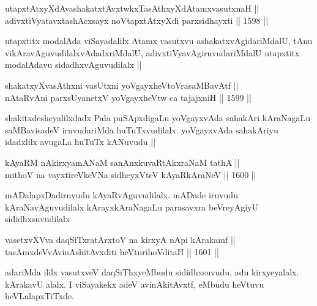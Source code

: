 \begin{shl}
utapxtAtxyXdAvashakatxtAvxtwkxTasAthxyXdAtamxvasutxnaH || \\
adivxtiVyatavxtashAcxsayx noVtapxtAtxyXdi parxsidhayxti \hfill || 1598 ||  
\end{shl}

\begin{artha}
utapxtitx modalAda viSayadalilx Atamx vasutxvu ashakatxvAgidariMdalU, tAnu vikAravAguvudilalxvAdadxriMdalU, adivxtiVyavAgiruvudariMdalU utapxtitx modalAdavu sidadhxvAguvudilalx ||
\end{artha}

\begin{shl}
shakatxyXvasAthxni vasUtxni yoVgayxheVtoVrasaMBavAtf || \\
nA\s \s taRvAni parxsUyanetxV yoVgayxheVtw ca tajajxniH ||  1599  || 
\end{shl}

\begin{artha}
shakitxdesheyalilxdadx Pala puSApxdigaLu yoVgayxvAda sahakAri kAraNagaLu saMBavisadeV iruvudariMda huTuTxvudilalx. yoVgayxvAda sahakAriyu idadxlilx avugaLa huTuTx kANuvudu ||
\end{artha}


\begin{shl}
kAyaRM nAkirxyamANaM sanAnxkuvaRtAkxraNaM tathA || \\
mithoV na vayxtireVkeVNa sidheyxVteV kAyaRkAraNeV \hfill || 1600 ||  
\end{shl}

\begin{artha}
mADalapxDadiruvudu kAyaRvAguvudilalx. mADade iruvudu  kAraNavAguvudilalx kArayxkAraNagaLu parasavxra beVreyAgiyU sididhxsuvudilalx
\end{artha}


\begin{shl}
vasetxvXVva daqSiTxratArxtoV na kirxyA nApi kArakamf || \\
tasAmxdeVvAvinAshitAvxditi heVturihoVditaH \hfill || 1601 ||  
\end{shl}

\begin{artha}
adariMda ililx vasutxveV daqSiThxyeMbudu sididhxsuvudu. adu kirxyeyalalx. kArakavU alalx. I viSayakekx adeV avinAkitAvxtf, eMbudu heVtuvu heVLalapxTiTxde.
\end{artha}

